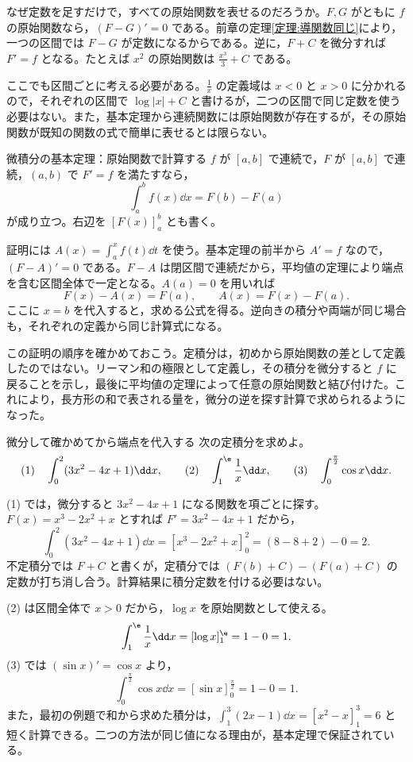 なぜ定数を足すだけで，すべての原始関数を表せるのだろうか。$F,G$ がともに $f$ の原始関数なら，$(F-G)'=0$ である。前章の定理\ref{定理:導関数同じ}により，一つの区間では $F-G$ が定数になるからである。逆に，$F+C$ を微分すれば $F'=f$ となる。たとえば $x^2$ の原始関数は $\frac{x^3}{3}+C$ である。

ここでも区間ごとに考える必要がある。$\frac1x$ の定義域は $x<0$ と $x>0$ に分かれるので，それぞれの区間で $\log|x|+C$ と書けるが，二つの区間で同じ定数を使う必要はない。また，基本定理から連続関数には原始関数が存在するが，その原始関数が既知の関数の式で簡単に表せるとは限らない。

\begin{theorem}{微積分の基本定理：原始関数で計算する}\label{定理:基本定理第二}
$f$ が $[a,b]$ で連続で，$F$ が $[a,b]$ で連続，$(a,b)$ で $F'=f$ を満たすなら，
\[
 \int_a^b f(x)\dd x=F(b)-F(a)
\]
が成り立つ。右辺を $[F(x)]_a^b$ とも書く。
\end{theorem}

証明には $A(x)=\int_a^x f(t)\dd t$ を使う。基本定理の前半から $A'=f$ なので，$(F-A)'=0$ である。$F-A$ は閉区間で連続だから，平均値の定理により端点を含む区間全体で一定となる。$A(a)=0$ を用いれば
\[
 F(x)-A(x)=F(a),\qquad A(x)=F(x)-F(a).
\]
ここに $x=b$ を代入すると，求める公式を得る。逆向きの積分や両端が同じ場合も，それぞれの定義から同じ計算式になる。

この証明の順序を確かめておこう。定積分は，初めから原始関数の差として定義したのではない。リーマン和の極限として定義し，その積分を微分すると $f$ に戻ることを示し，最後に平均値の定理によって任意の原始関数と結び付けた。これにより，長方形の和で表される量を，微分の逆を探す計算で求められるようになった。

\begin{example}{微分して確かめてから端点を代入する}
次の定積分を求めよ。
\[
 \text{(1)}\quad\int_0^2(3x^2-4x+1)\dd x,\qquad
 \text{(2)}\quad\int_1^{\e}\frac1x\dd x,\qquad
 \text{(3)}\quad\int_0^{\frac\pi2}\cos x\dd x.
\]
\end{example}
(1) では，微分すると $3x^2-4x+1$ になる関数を項ごとに探す。$F(x)=x^3-2x^2+x$ とすれば $F'=3x^2-4x+1$ だから，
\[
 \int_0^2(3x^2-4x+1)\dd x
 =[x^3-2x^2+x]_0^2=(8-8+2)-0=2.
\]
不定積分では $F+C$ と書くが，定積分では $(F(b)+C)-(F(a)+C)$ の定数が打ち消し合う。計算結果に積分定数を付ける必要はない。

(2) は区間全体で $x>0$ だから，$\log x$ を原始関数として使える。
\[
 \int_1^{\e}\frac1x\dd x=[\log x]_1^{\e}=1-0=1.
\]
(3) では $(\sin x)'=\cos x$ より，
\[
 \int_0^{\frac\pi2}\cos x\dd x
 =[\sin x]_0^{\frac\pi2}=1-0=1.
\]
また，最初の例題で和から求めた積分は，$\int_1^3(2x-1)\dd x=[x^2-x]_1^3=6$ と短く計算できる。二つの方法が同じ値になる理由が，基本定理で保証されている。

